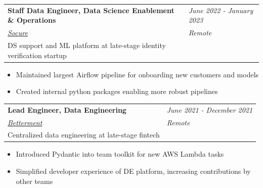 \documentclass[margin,line]{res}
\begin{document}
\begin{resume}
  \begin{tabular}{p{4.6in} l}
    {\bf Staff Data Engineer, Data Science Enablement \& Operations} & \emph{June 2022 - January 2023} \\
    \href{https://socure.com}{\it Socure}                            & \emph{Remote}                   \\
    DS support and ML platform at late-stage identity verification startup
  \end{tabular}
  \vspace{2pt}
  \begin{itemize}\itemsep -2pt
    \item Maintained largest Airflow pipeline for onboarding new customers and models
    \item Created internal python packages enabling more robust pipelines
  \end{itemize}
  
  \begin{tabular}{p{4.6in} l}
    {\bf Lead Engineer, Data Engineering}         & \emph{June 2021 - December 2021} \\
    \href{https://betterment.com}{\it Betterment} & \emph{Remote}                    \\
    Centralized data engineering at late-stage fintech
  \end{tabular}
  \vspace{2pt}
  \begin{itemize}\itemsep -2pt
    \item Introduced Pydantic into team toolkit for new AWS Lambda tasks
    \item Simplified developer experience of DE platform, increasing contributions by other teams
  \end{itemize}
  

\end{resume}
\end{document}
